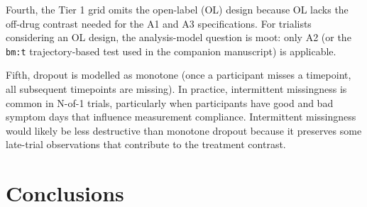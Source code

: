 \documentclass[
]{article}
\begin{document}
Fourth, the Tier 1 grid omits the open-label (OL) design because
OL lacks the off-drug contrast needed for the A1 and A3
specifications. For trialists considering an OL design, the
analysis-model question is moot: only A2 (or the \texttt{bm:t}
trajectory-based test used in the companion manuscript) is
applicable.

Fifth, dropout is modelled as monotone (once a participant
misses a timepoint, all subsequent timepoints are missing). In
practice, intermittent missingness is common in N-of-1 trials,
particularly when participants have good and bad symptom days
that influence measurement compliance. Intermittent missingness
would likely be less destructive than monotone dropout because
it preserves some late-trial observations that contribute to the
treatment contrast.

\section{Conclusions}\label{conclusions}
\end{document}
